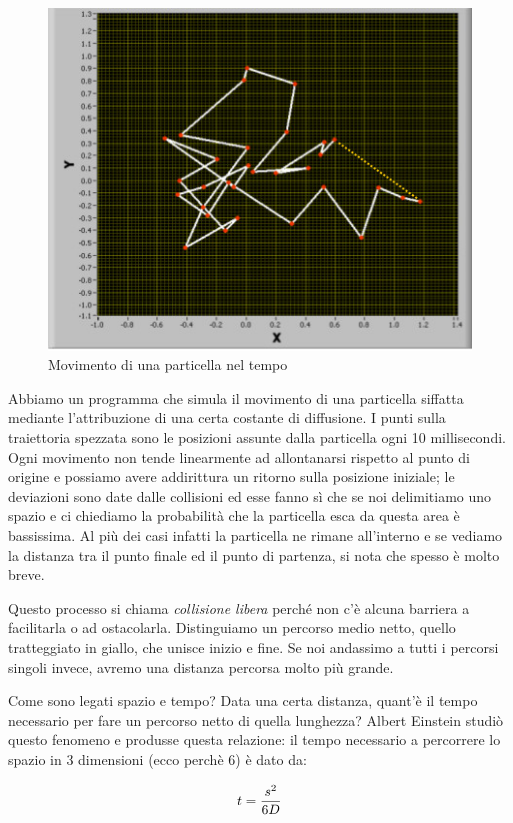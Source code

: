 \documentclass[a4paper,12pt]{article}
\begin{document}
\begin{figure}[H]
\centering
\includegraphics[scale=0.6]{immagine/spezzata.jpg}
\caption{Movimento di una particella nel tempo}
\end{figure}
Abbiamo un programma che simula il movimento di una particella siffatta mediante l'attribuzione di una certa costante di diffusione.
I punti sulla traiettoria spezzata sono le posizioni assunte dalla particella ogni 10 millisecondi. Ogni movimento non tende linearmente ad allontanarsi rispetto al punto di origine e possiamo avere addirittura un ritorno sulla posizione iniziale; le deviazioni sono date dalle collisioni ed esse fanno sì che se noi delimitiamo uno spazio e ci chiediamo la probabilità che la particella esca da questa area è bassissima. Al più dei casi infatti la particella ne rimane all'interno e se vediamo la distanza tra il punto finale ed il punto di partenza, si nota che spesso è molto breve.

Questo processo si chiama \emph{collisione libera} perché non c'è alcuna barriera a facilitarla o ad ostacolarla. Distinguiamo un percorso medio netto, quello tratteggiato in giallo, che unisce inizio e fine. Se noi andassimo a tutti i percorsi singoli invece, avremo una distanza percorsa molto più grande.

Come sono legati spazio e tempo? Data una certa distanza, quant'è il tempo necessario per fare un percorso netto di quella lunghezza? 
Albert Einstein studiò questo fenomeno e produsse questa relazione: il tempo necessario a percorrere lo spazio in 3 dimensioni (ecco perchè 6) è dato da:

\begin{equation}
\centering
t=\frac{s^{2}}{6D}
\end{equation}
\end{document}
